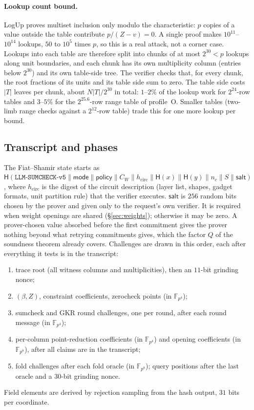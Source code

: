 \documentclass[11pt]{article}
\newcommand{\F}{\mathbb{F}}
\newcommand{\Fq}{\F_{p^4}}
\newcommand{\Fo}{\F_{p^8}}
\begin{document}
\paragraph{Lookup count bound.}
LogUp proves multiset inclusion only modulo the characteristic: \(p\) copies of a value outside the table contribute \(p/(Z - v) = 0\).
A single proof makes \(10^{11}\)--\(10^{14}\) lookups, \(50\) to \(10^5\) times \(p\), so this is a real attack, not a corner case.
Lookups into each table are therefore split into chunks of at most \(2^{30} < p\) lookups along unit boundaries, and each chunk has its own multiplicity column (entries below \(2^{30}\)) and its own table-side tree.
The verifier checks that, for every chunk, the root fractions of its units and its table side sum to zero.
The table side costs \(|T|\) leaves per chunk, about \(N |T| / 2^{30}\) in total: \(1\)--\(2\%\) of the lookup work for \(2^{24}\)-row tables and \(3\)--\(5\%\) for the \(2^{25.6}\)-row range table of profile~O.
Smaller tables (two-limb range checks against a \(2^{12}\)-row table) trade this for one more lookup per bound.

\subsection{Transcript and phases}

The Fiat--Shamir state starts as \(\mathsf{H}(\texttt{LLM-SUMCHECK-v5} \| \mathsf{mode} \| \mathsf{policy} \| C_W \| h_{\mathrm{circ}} \| \mathsf{H}(x) \| \mathsf{H}(y) \| n_c \| S \| \mathsf{salt})\), where \(h_{\mathrm{circ}}\) is the digest of the circuit description (layer list, shapes, gadget formats, unit partition rule) that the verifier executes.
\(\mathsf{salt}\) is \(256\) random bits chosen by the prover and given only to the request's own verifier.
It is required when weight openings are shared (\S\ref{sec:weights}); otherwise it may be zero.
A prover-chosen value absorbed before the first commitment gives the prover nothing beyond what retrying commitments gives, which the factor \(Q\) of the soundness theorem already covers.
Challenges are drawn in this order, each after everything it tests is in the transcript:
\begin{enumerate}
\item trace root (all witness columns and multiplicities), then an \(11\)-bit grinding nonce;
\item \((\beta, Z)\), constraint coefficients, zerocheck points (in \(\Fq\));
\item sumcheck and GKR round challenges, one per round, after each round message (in \(\Fq\));
\item per-column point-reduction coefficients (in \(\Fq\)) and opening coefficients (in \(\Fo\)), after all claims are in the transcript;
\item fold challenges after each fold oracle (in \(\Fo\)); query positions after the last oracle and a \(30\)-bit grinding nonce.
\end{enumerate}
Field elements are derived by rejection sampling from the hash output, \(31\) bits per coordinate.
\end{document}
